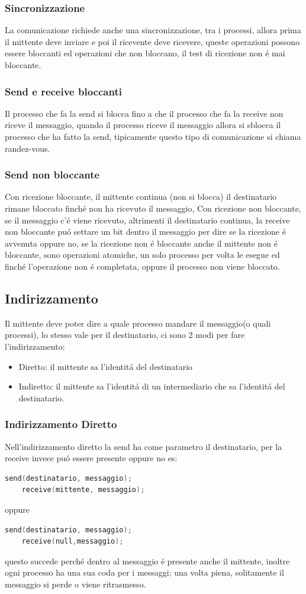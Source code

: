 \subsubsection{Sincronizzazione}
La comunicazione richiede anche una sincronizzazione, tra i processi, allora prima il mittente deve inviare e poi il ricevente deve ricevere,
queste operazioni possono essere bloccanti ed operazioni che non bloccano, il test di ricezione non é mai bloccante.
\subsubsection*{Send e receive bloccanti}
Il processo che fa la send si blocca fino a che il processo che fa la receive non riceve il messaggio, quando il processo riceve il messaggio allora
si sblocca il processo che ha fatto la send, tipicamente questo tipo di comunicazione si chiama randez-vous.
\subsubsection*{Send non bloccante}
Con ricezione bloccante, il mittente continua (non si blocca) il destinatario rimane bloccato finché non ha ricevuto il messaggio,
Con ricezione non bloccante, se il messaggio c'é viene ricevuto, altrimenti il destinatario continua, la receive non bloccante puó settare un bit dentro il messaggio
per dire se la ricezione é avvenuta oppure no, se la ricezione non é bloccante anche il mittente non é bloccante, sono operazioni atomiche, un solo processo per volta le esegue ed
finché l'operazione non é completata, oppure il processo non viene bloccato.
\subsection{Indirizzamento}
Il mittente deve poter dire a quale processo mandare il messaggio(o quali processi), lo stesso vale per il destinatario, ci sono 2 modi per fare l'indirizzamento:
\begin{itemize}
    \item Diretto: il mittente sa l'identitá del destinatario
    \item Indiretto: il mittente sa l'identitá di un intermediario che sa l'identitá del destinatario.
\end{itemize}
\subsubsection*{Indirizzamento Diretto}
Nell'indirizzamento diretto la send ha come parametro il destinatario, per la receive invece puó essere presente oppure no es:
\begin{lstlisting}[language=C]
    send(destinatario, messaggio);
    receive(mittente, messaggio);
\end{lstlisting}
oppure
\begin{lstlisting}[language=C]
    send(destinatario, messaggio);
    receive(null,messaggio);
\end{lstlisting}
questo succede perché dentro al messaggio é presente anche il mittente, inoltre ogni processo ha una sua coda per i messaggi; una volta piena, solitamente il messaggio si perde o
viene ritrasmesso.
